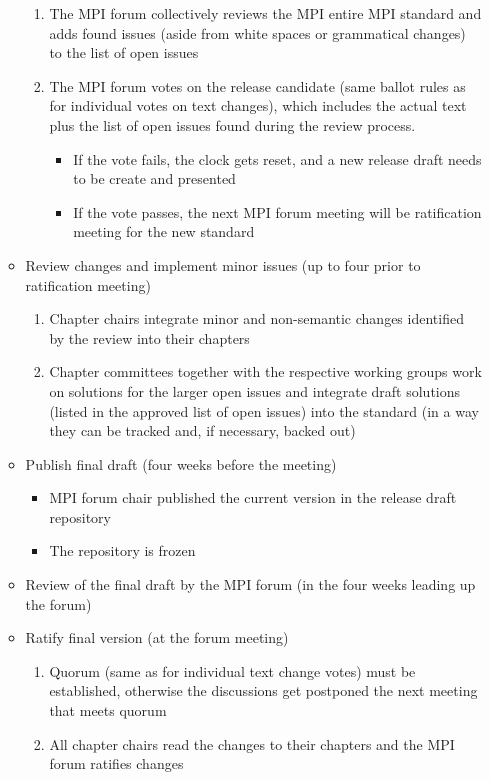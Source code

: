 \begin{enumerate}
\begin{itemize}
\begin{enumerate}
\item The MPI forum collectively reviews the MPI entire MPI standard and adds found issues (aside from white spaces or grammatical changes) to the list of open issues 
\item The MPI forum votes on the release candidate (same ballot rules as for individual votes on text changes), which includes the actual text plus the list of open issues found during the review process.
\begin{itemize}
\item If the vote fails, the clock gets reset, and a new release draft needs to be create and presented
\item If the vote passes, the next MPI forum meeting will be ratification meeting for the new standard
\end{itemize}
\end{enumerate}
\item Review changes and implement minor issues (up to four prior to ratification meeting)
\begin{enumerate}
\item Chapter chairs integrate minor and non-semantic changes identified by the review into their chapters
\item Chapter committees together with the respective working groups work on solutions for the larger open issues and integrate draft solutions (listed in  the approved list of open issues) into the standard (in a way they can be tracked and, if necessary, backed out)
\end{enumerate}
\item Publish final draft (four weeks before the meeting)
\begin{itemize}
\item MPI forum chair published the current version in the release draft repository
\item The repository is frozen
\end{itemize}
\item Review of the final  draft by the MPI forum (in the four weeks leading up the forum)
\item Ratify final version (at the forum meeting)
\begin{enumerate}
\item Quorum (same as for individual text change votes) must be established, otherwise the discussions get postponed the next meeting that meets quorum
\item All chapter chairs read the changes to their chapters and the MPI forum ratifies changes

\end{enumerate}
\end{itemize}
\end{enumerate}
